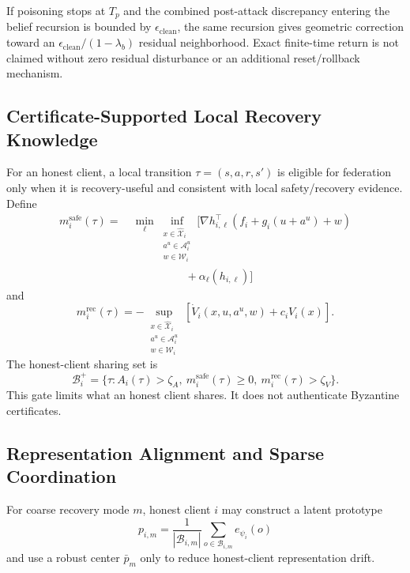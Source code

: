 If poisoning stops at $T_p$ and the combined post-attack discrepancy entering the belief recursion is bounded by $\epsilon_{\mathrm{clean}}$, the same recursion gives geometric correction toward an $\epsilon_{\mathrm{clean}}/(1-\lambda_b)$ residual neighborhood. Exact finite-time return is not claimed without zero residual disturbance or an additional reset/rollback mechanism.

\subsection{Certificate-Supported Local Recovery Knowledge}
For an honest client, a local transition $\tau=(s,a,r,s')$ is eligible for federation only when it is recovery-useful and consistent with local safety/recovery evidence. Define
\begin{align}
m_i^{\mathrm{safe}}(\tau)
=&\ \min_\ell\inf_{\substack{x\in\widehat{\mathcal X}_i\\a^u\in\mathcal A_i^u\\w\in\mathcal W_i}}
\Big[\nabla h_{i,\ell}^{\top}(f_i+g_i(u+a^u)+w) \nonumber\\
&\hspace{5em}+\alpha_\ell(h_{i,\ell})\Big]
\end{align}
and
\begin{equation}
m_i^{\mathrm{rec}}(\tau)=-
\sup_{\substack{x\in\widehat{\mathcal X}_i\\a^u\in\mathcal A_i^u\\w\in\mathcal W_i}}
[\dot V_i(x,u,a^u,w)+c_iV_i(x)].
\end{equation}
The honest-client sharing set is
\begin{equation}
\mathcal B_i^+=
\{\tau:A_i(\tau)>\zeta_A,\ 
m_i^{\mathrm{safe}}(\tau)\ge0,\ 
m_i^{\mathrm{rec}}(\tau)>\zeta_V\}.
\end{equation}
This gate limits what an honest client shares. It does not authenticate Byzantine certificates.

\subsection{Representation Alignment and Sparse Coordination}
For coarse recovery mode $m$, honest client $i$ may construct a latent prototype
\begin{equation}
p_{i,m}=\frac{1}{|\mathcal B_{i,m}|}\sum_{o\in\mathcal B_{i,m}}e_{\psi_i}(o)
\end{equation}
and use a robust center $\bar p_m$ only to reduce honest-client representation drift.

